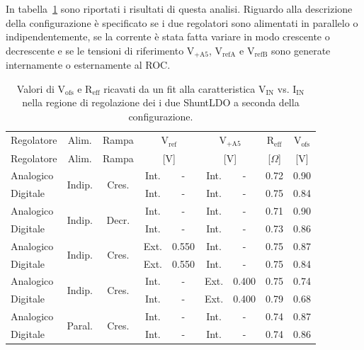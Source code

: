 In tabella~\ref{table:results} sono riportati i risultati di questa analisi. Riguardo alla descrizione della configurazione è specificato se i due regolatori sono alimentati in parallelo o indipendentemente, se la corrente è stata fatta variare in modo crescente o decrescente e se le tensioni di riferimento $\mathrm{V_{+A5}}$, $\mathrm{V_{refA}}$ e $\mathrm{V_{refB}}$ sono generate internamente o esternamente al ROC.
\begin{center}
\begin{table}
\begin{tabular}{l|c|c|c|c|c|c|c|c}
Regolatore & Alim. & Rampa & \multicolumn{2}{c|}{$\mathrm{V_{ref}}$} & \multicolumn{2}{c|}{$\mathrm{V_{+A5}}$} & $\mathrm{R_{eff}}$& $\mathrm{V_{ofs}}$ \\
Regolatore & Alim. & Rampa & \multicolumn{2}{c|}{[V]}               & \multicolumn{2}{c|}{[V]}                & [$\Omega$]       & [V]               \\ \hline
Analogico & \multirow{2}{*}{Indip.} & \multirow{2}{*}{Cres.} & Int. & - & Int. & - & 0.72 & 0.90 \\
Digitale  &  &  & Int. & - & Int. & - & 0.75  & 0.84 \\ \hline

Analogico & \multirow{2}{*}{Indip.} & \multirow{2}{*}{Decr.} & Int. & - & Int. & - & 0.71 & 0.90 \\
Digitale  &  &  & Int. & - & Int. & - & 0.73  & 0.86 \\ \hline

Analogico & \multirow{2}{*}{Indip.} & \multirow{2}{*}{Cres.} & Ext. & 0.550 & Int. & - & 0.75 & 0.87 \\
Digitale  &  &  & Ext. & 0.550 & Int. & - & 0.75  & 0.84 \\ \hline

Analogico & \multirow{2}{*}{Indip.} & \multirow{2}{*}{Cres.} & Int. & - & Ext. & 0.400 & 0.75 & 0.74 \\
Digitale  &  &  & Int. & - & Ext. & 0.400 & 0.79  & 0.68 \\ \hline

Analogico & \multirow{2}{*}{Paral.} & \multirow{2}{*}{Cres.} & Int. & - & Int. & - & 0.74 & 0.87 \\
Digitale  &  &  & Int. & - & Int. & - & 0.74  & 0.86 \\
\end{tabular}
\caption{Valori di $\mathrm{V_{ofs}}$ e $\mathrm{R_{eff}}$ ricavati da un fit alla caratteristica $\mathrm{V_{IN}}$ vs. $\mathrm{I_{IN}}$ nella regione di regolazione dei i due ShuntLDO a seconda della configurazione.}
\label{table:results}
\end{table}
\end{center}

